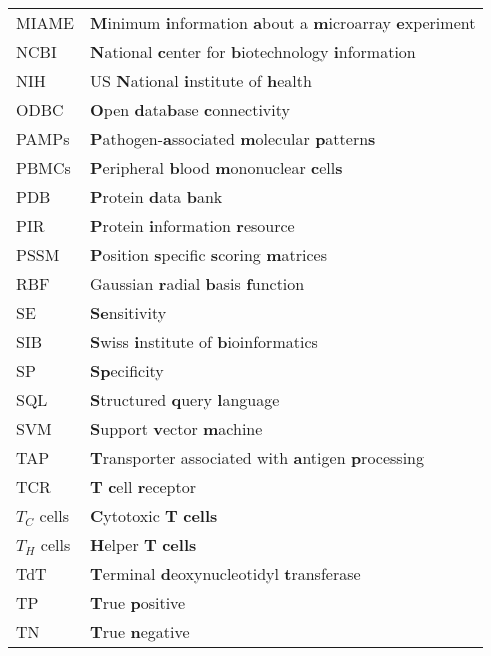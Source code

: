 \begin{table} [h]
{\begin{tabular}{l l}
MIAME & \textbf{M}inimum \textbf{i}nformation \textbf{a}bout a \textbf{m}icroarray \textbf{e}xperiment\\
NCBI & \textbf{N}ational \textbf{c}enter for \textbf{b}iotechnology \textbf{i}nformation\\
NIH & US \textbf{N}ational \textbf{i}nstitute of \textbf{h}ealth\\
ODBC & \textbf{O}pen \textbf{d}ata\textbf{b}ase \textbf{c}onnectivity\\
PAMPs & \textbf{P}athogen-\textbf{a}ssociated \textbf{m}olecular \textbf{p}attern\textbf{s}\\
PBMCs & \textbf{P}eripheral \textbf{b}lood \textbf{m}ononuclear \textbf{c}ell\textbf{s}\\
PDB & \textbf{P}rotein \textbf{d}ata \textbf{b}ank\\
PIR & \textbf{P}rotein \textbf{i}nformation \textbf{r}esource\\
PSSM & \textbf{P}osition \textbf{s}pecific \textbf{s}coring \textbf{m}atrices\\
RBF & Gaussian \textbf{r}adial \textbf{b}asis \textbf{f}unction\\
SE & \textbf{Se}nsitivity\\
SIB & \textbf{S}wiss \textbf{i}nstitute of \textbf{b}ioinformatics\\
SP & \textbf{Sp}ecificity\\
SQL & \textbf{S}tructured \textbf{q}uery \textbf{l}anguage\\
SVM & \textbf{S}upport \textbf{v}ector \textbf{m}achine\\
TAP & \textbf{T}ransporter associated with \textbf{a}ntigen \textbf{p}rocessing\\
TCR & \textbf{T} \textbf{c}ell \textbf{r}eceptor\\
$T_C$ cells & \textbf{C}ytotoxic \textbf{T} \textbf{cells}\\
$T_H$ cells & \textbf{H}elper \textbf{T} \textbf{cells}\\
TdT & \textbf{T}erminal \textbf{d}eoxynucleotidyl \textbf{t}ransferase\\
TP & \textbf{T}rue \textbf{p}ositive\\
TN & \textbf{T}rue \textbf{n}egative\\
\end{tabular}
\label{table:abb} }
\end{table}

